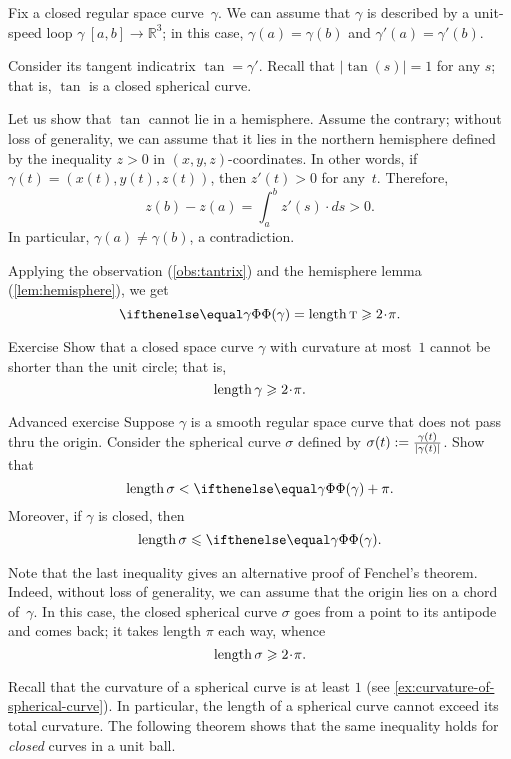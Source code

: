 Fix a closed regular space curve~$\gamma$.
We can assume that $\gamma$ is described by a unit-speed loop $\gamma\:[a,b]\to \mathbb{R}^3$;
in this case, $\gamma(a)=\gamma(b)$ and $\gamma'(a)=\gamma'(b)$.

Consider its tangent indicatrix $\tan=\gamma'$.
Recall that $|\tan(s)|=1$ for any $s$; that is, $\tan$ is a closed spherical curve.

Let us show that $\tan$ cannot lie in a hemisphere.
Assume the contrary; without loss of generality, we can assume that it lies in the northern hemisphere defined by the inequality $z>0$ in $(x,y,z)$-coordinates.
In other words, if $\gamma(t)=(x(t), y(t), z(t))$, then $z'(t)>0$ for any~$t$.
Therefore,
\[z(b)-z(a)=\int_a^b z'(s)\cdot ds>0.\]
In particular, $\gamma(a)\ne \gamma(b)$, a contradiction.

Applying the observation (\ref{obs:tantrix}) and the hemisphere lemma (\ref{lem:hemisphere}), we get  
\[\tc\gamma=\length \tan\ge2\cdot\pi.\]
\qedsf

\begin{thm}{Exercise}\label{ex:length>=2pi}
Show that a closed space curve $\gamma$ with curvature at most~$1$ cannot be shorter than the unit circle;
that is, 
\[\length\gamma\ge 2\cdot \pi.\]

\end{thm}


\begin{thm}{Advanced exercise}\label{ex:gamma/|gamma|}
Suppose $\gamma$ is a smooth regular space curve that does not pass thru the origin.
Consider the spherical curve $\sigma$ defined by $\sigma(t)\mathrel{:=}\frac{\gamma(t)}{|\gamma(t)|}$.
Show that 
\[\length \sigma< \tc\gamma+\pi.\]
Moreover, if $\gamma$ is closed, then
\[\length \sigma\le \tc\gamma.\]
\end{thm}

Note that the last inequality gives an alternative proof of Fenchel's theorem.
Indeed, without loss of generality, we can assume that the origin lies on a chord of~$\gamma$.
In this case, the closed spherical curve $\sigma$ goes from a point to its antipode and comes back; 
it takes length $\pi$ each way, 
whence 
\[\length\sigma\ge 2\cdot\pi.\]

Recall that the curvature of a spherical curve is at least $1$
(see \ref{ex:curvature-of-spherical-curve}).
In particular, the length of a spherical curve cannot exceed its total curvature.
The following theorem shows that the same inequality holds for {}\emph{closed} curves in a unit ball.

